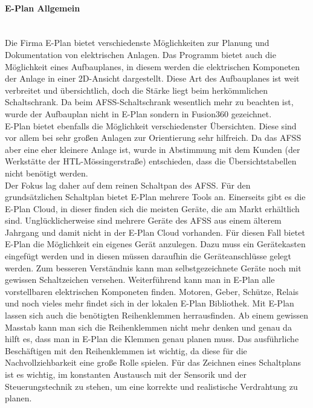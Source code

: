     \paragraph{E-Plan Allgemein}\mbox{}\\
    Die Firma E-Plan bietet verschiedenste Möglichkeiten zur Planung und Dokumentation von elektrischen Anlagen. Das Programm bietet auch die Möglichkeit eines Aufbauplanes, in diesem werden die elektrischen Komponeten der Anlage in einer 2D-Ansicht dargestellt. Diese Art des Aufbauplanes ist weit verbreitet und übersichtlich, doch die Stärke liegt beim herkömmlichen Schaltschrank. Da beim AFSS-Schaltschrank wesentlich mehr zu beachten ist, wurde der Aufbauplan nicht in E-Plan sondern in Fusion360 gezeichnet.\\
    E-Plan bietet ebenfalls die Möglichkeit verschiedenster Übersichten. Diese sind vor allem bei sehr großen Anlagen zur Orientierung sehr hilfreich. Da das AFSS aber eine eher kleinere Anlage ist, wurde in Abstimmung mit dem Kunden (der Werkstätte der HTL-Mössingerstraße) entschieden, dass die Übersichtstabellen nicht benötigt werden.\\
    Der Fokus lag daher auf dem reinen Schaltpan des AFSS. Für den grundsätzlichen Schaltplan bietet E-Plan mehrere Tools an. Einerseits gibt es die E-Plan Cloud, in dieser finden sich die meisten Geräte, die am Markt erhältlich sind. Unglücklicherweise sind mehrere Geräte des AFSS aus einem älterem Jahrgang und damit nicht in der E-Plan Cloud vorhanden. Für diesen Fall bietet E-Plan die Möglichkeit ein eigenes Gerät anzulegen. Dazu muss ein Gerätekasten eingefügt werden und in diesen müssen daraufhin die Geräteanschlüsse gelegt werden. Zum besseren Verständnis kann man selbstgezeichnete Geräte noch mit gewissen Schaltzeichen versehen. Weiterführend kann man in E-Plan alle vorstellbaren elektrischen Komponeten finden. Motoren, Geber, Schütze, Relais und noch vieles mehr findet sich in der lokalen E-Plan Bibliothek. Mit E-Plan lassen sich auch die benötigten Reihenklemmen herrausfinden. Ab einem gewissen Masstab kann man sich die Reihenklemmen nicht mehr denken und genau da hilft es, dass man in E-Plan die Klemmen genau planen muss. Das ausführliche Beschäftigen mit den Reihenklemmen ist wichtig, da diese für die Nachvollziehbarkeit eine große Rolle spielen. Für das Zeichnen eines Schaltplans ist es wichtig, im konstanten Austausch mit der Sensorik und der Steuerungstechnik zu stehen, um eine korrekte und realistische Verdrahtung zu planen.\\
